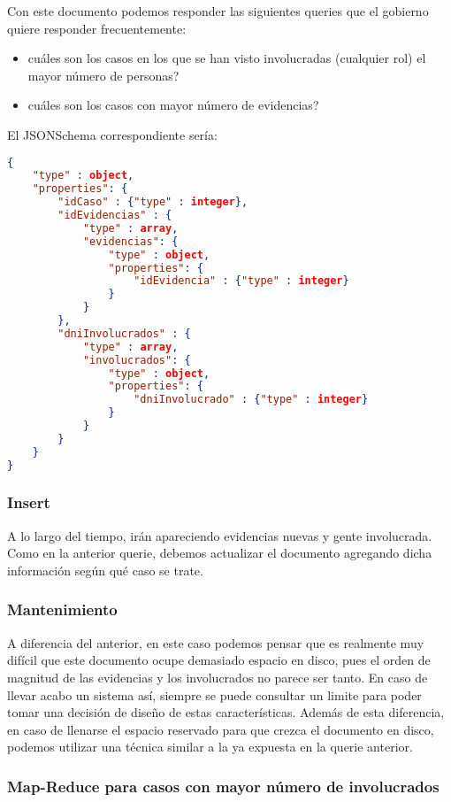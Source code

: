 \documentclass[11pt, a4paper]{article}
\begin{document}
Con este documento podemos responder las siguientes queries que el gobierno quiere responder frecuentemente:
\begin{itemize}
	\item cuáles son los casos en los que se han visto involucradas (cualquier rol) el mayor número de personas?
	\item cuáles son los casos con mayor número de evidencias?
\end{itemize}

El JSONSchema correspondiente sería:
\begin{lstlisting}[language=json]
{
	"type" : object,
	"properties": {
		"idCaso" : {"type" : integer},
		"idEvidencias" : {
			"type" : array,
			"evidencias": {
				"type" : object,
				"properties": {
					"idEvidencia" : {"type" : integer}
				}
			}
		},
		"dniInvolucrados" : {
			"type" : array,
			"involucrados": {
				"type" : object,
				"properties": {
					"dniInvolucrado" : {"type" : integer}
				}
			}
		}
	}
}
\end{lstlisting}

\subsubsection{Insert}

A lo largo del tiempo, ir\'an apareciendo evidencias nuevas y gente involucrada. Como en la anterior querie, debemos actualizar el documento agregando dicha informaci\'on seg\'un qué caso se trate.

\subsubsection{Mantenimiento}

A diferencia del anterior, en este caso podemos pensar que es realmente muy difícil que este documento ocupe demasiado espacio en disco, pues el orden de magnitud de las evidencias y los involucrados no parece ser tanto. En caso de llevar acabo un sistema as\'i, siempre se puede consultar un limite para poder tomar una decisi\'on de dise\~no de estas caracter\'isticas. Adem\'as de esta diferencia, en caso de llenarse el espacio reservado para que crezca el documento en disco, podemos utilizar una t\'ecnica similar a la ya expuesta en la querie anterior.

\subsubsection{Map-Reduce para casos con mayor número de involucrados}
\end{document}
